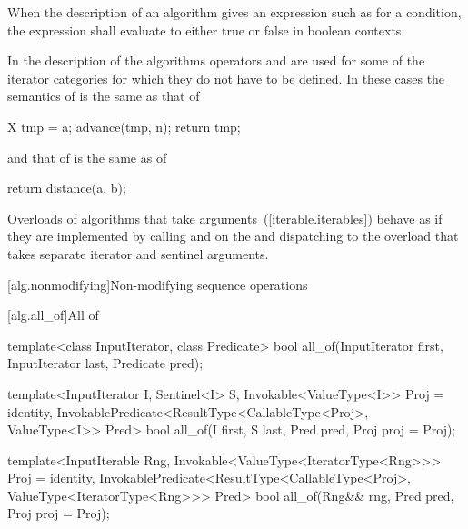 \begin{removedblock}
\pnum
When the description of an algorithm gives an expression such as
for a condition, the expression shall evaluate to
either true or false in boolean contexts.
\end{removedblock}

\pnum
In the description of the algorithms operators
\tcode{+}
and
\tcode{-}
are used for some of the iterator categories for which
they do not have to be defined.
In these cases the semantics of
is the same as that of

\begin{codeblock}
X tmp = a;
advance(tmp, n);
return tmp;
\end{codeblock}

and that of
is the same as of

\begin{codeblock}
return distance(a, b);
\end{codeblock}

\begin{addedblock}
\pnum
Overloads of algorithms that take  arguments~(\ref{iterable.iterables})
behave as if they are implemented by calling  and  on
the  and dispatching to the overload that takes separate
iterator and sentinel arguments.
\end{addedblock}

[alg.nonmodifying]{Non-modifying sequence operations}

[alg.all_of]{All of}

%
\begin{removedblock}
\begin{itemdecl}
template<class InputIterator, class Predicate>
  bool all_of(InputIterator first, InputIterator last, Predicate pred);
\end{itemdecl}
\end{removedblock}
\begin{addedblock}
\begin{itemdecl}
template<InputIterator I, Sentinel<I> S, Invokable<ValueType<I>> Proj = identity,
    InvokablePredicate<ResultType<CallableType<Proj>, ValueType<I>> Pred>
  bool all_of(I first, S last, Pred pred, Proj proj = Proj{});

template<InputIterable Rng, Invokable<ValueType<IteratorType<Rng>>> Proj = identity,
    InvokablePredicate<ResultType<CallableType<Proj>, ValueType<IteratorType<Rng>>> Pred>
  bool all_of(Rng&& rng, Pred pred, Proj proj = Proj{});
\end{itemdecl}
\end{addedblock}


